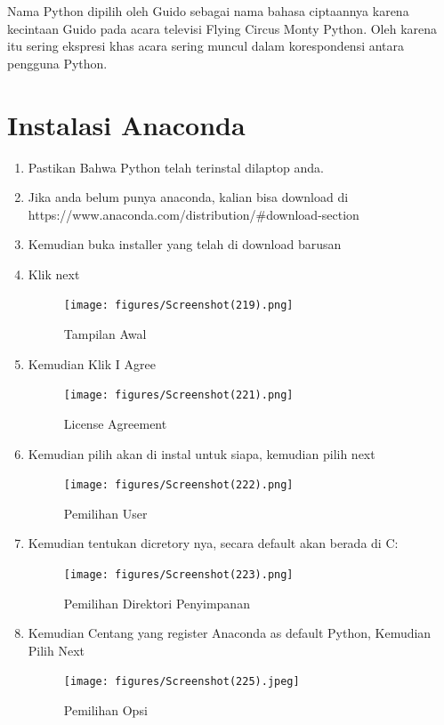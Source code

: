 Nama Python dipilih oleh Guido sebagai nama bahasa ciptaannya karena kecintaan Guido pada acara televisi Flying Circus Monty Python. Oleh karena itu sering ekspresi khas acara sering muncul dalam korespondensi antara pengguna Python.
\section{Instalasi Anaconda}
\begin{enumerate}
    \item Pastikan Bahwa Python telah terinstal dilaptop anda.
    \item Jika anda belum punya anaconda, kalian bisa download di https://www.anaconda.com/distribution/#download-section
    \item Kemudian buka installer yang telah di download barusan
    \item Klik next
    \begin{figure}[!htbp]
        \centering
        \texttt{[image: figures/Screenshot(219).png]}
        \caption{Tampilan Awal}
        \label{awal}
        \end{figure}

    \item Kemudian Klik I Agree
    \begin{figure}[!htbp]
        \centering
        \texttt{[image: figures/Screenshot(221).png]}
        \caption{License Agreement}
        \label{License}
        \end{figure}

    \item Kemudian pilih akan di instal untuk siapa, kemudian pilih next
    \begin{figure}[!htbp]
        \centering
        \texttt{[image: figures/Screenshot(222).png]}
        \caption{Pemilihan User}
        \label{User}
        \end{figure}

    \item Kemudian tentukan dicretory nya, secara default akan berada di C:\Users\namakomputer{}
    \begin{figure}[!htbp]
        \centering
        \texttt{[image: figures/Screenshot(223).png]}
        \caption{Pemilihan Direktori Penyimpanan}
        \label{Directory}
        \end{figure}

    \item Kemudian Centang yang register Anaconda as default Python, Kemudian Pilih Next
    \begin{figure}[!htbp]
        \centering
        \texttt{[image: figures/Screenshot(225).jpeg]}
        \caption{Pemilihan Opsi}
        \label{opsi}
        \end{figure}


\end{enumerate}
